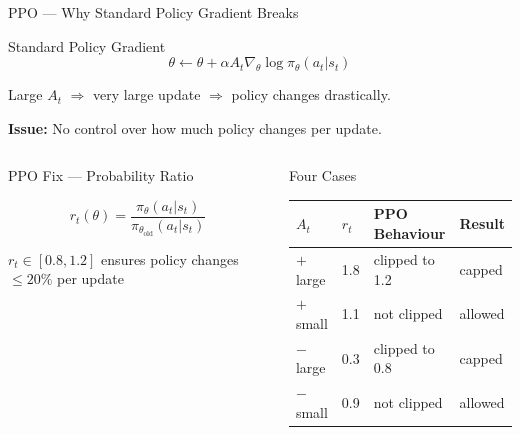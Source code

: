 \documentclass[10pt, aspectratio=169]{beamer}
\begin{document}
\begin{frame}[t]{PPO --- Why Standard Policy Gradient Breaks}

\normalsize

\begin{alertblock}{Standard Policy Gradient}
\[
\theta \leftarrow \theta + \alpha A_t \nabla_\theta \log \pi_\theta(a_t|s_t)
\]

Large $A_t$ $\Rightarrow$ very large update $\Rightarrow$ policy changes drastically.

\textbf{Issue:} No control over how much policy changes per update.
\end{alertblock}

\vspace{0cm}

\begin{columns}[T,onlytextwidth]


\begin{exampleblock}{PPO Fix --- Probability Ratio}

\vspace{0.1cm}

\[
r_t(\theta)=
\frac{\pi_\theta(a_t|s_t)}
{\pi_{\theta_{\text{old}}}(a_t|s_t)}
\]

\vspace{0.2cm}

\centering
\large
\alert{$r_t \in [0.8,1.2]$ ensures policy changes $\le 20\%$ per update}

\end{exampleblock}


\begin{block}{Four Cases}

\small
\renewcommand{\arraystretch}{1.4}

\begin{tabular}{llll}
\hline
$A_t$ & $r_t$ & PPO Behaviour & Result\\
\hline
$+$ large & 1.8 & clipped to 1.2 & capped\\
$+$ small & 1.1 & not clipped & allowed\\
$-$ large & 0.3 & clipped to 0.8 & capped\\
$-$ small & 0.9 & not clipped & allowed\\
\hline
\end{tabular}

\end{block}

\end{columns}

\end{frame}
\end{document}
